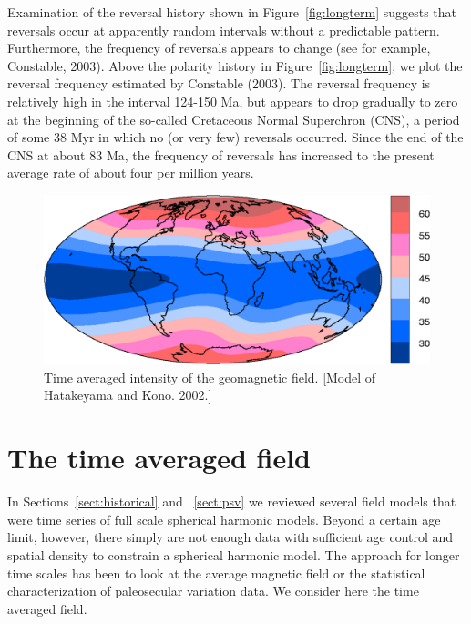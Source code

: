 Examination of the reversal history shown in Figure~\ref{fig:longterm}
suggests that reversals occur at apparently random intervals without a
predictable pattern.  Furthermore, the frequency of reversals appears
to change (see for example,
Constable, 2003).
Above the polarity history in 
Figure~\ref{fig:longterm}, we plot the reversal frequency estimated by 
Constable (2003). \nocite{constable03}   The reversal
frequency is relatively high in the interval 124-150 Ma, but appears
to drop gradually to zero at the beginning of the so-called Cretaceous
Normal Superchron (CNS), a period of some 38 Myr in which no (or very few)
reversals occurred. Since the end of the CNS at about 83  Ma, the
frequency of reversals has increased to the present average rate of
about four per million years.  


\begin{figure}[htb]
\centering  \includegraphics[width=10 cm]{EPSfiles/hk02.eps}
\caption{Time averaged intensity of the geomagnetic field.  [Model  of  Hatakeyama and Kono.  2002.] }
\label{fig:taf}
\end{figure}





\section{The time averaged field}


In Sections~\ref{sect:historical} and ~\ref{sect:psv}  we reviewed several field models that were time series of full scale spherical harmonic models.  Beyond a certain age  limit, however, there simply are not enough data with sufficient age control and spatial density to constrain a spherical harmonic model.  The approach for longer time scales has been to look at the average magnetic field or the statistical characterization of paleosecular variation data.  We consider here the time averaged field. 

